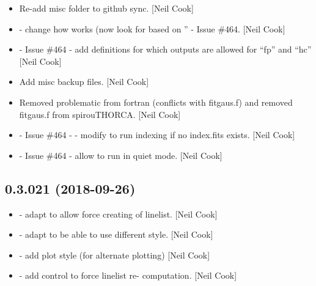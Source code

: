 \documentclass[a4paper,10pt,english]{report}
\begin{document}
\begin{itemize}
\item {} 
Re-add misc folder to github sync. {[}Neil Cook{]}

\item {} 
 - change how  works (now look for
 based on ” - Issue \#464. {[}Neil
Cook{]}

\item {} 
 - Issue \#464 - add definitions for which
outputs are allowed for “fp” and “hc” {[}Neil Cook{]}

\item {} 
Add misc backup files. {[}Neil Cook{]}

\item {} 
Removed problematic  from fortran (conflicts with fitgaus.f)
and removed fitgaus.f from spirouTHORCA. {[}Neil Cook{]}

\item {} 
 - Issue \#464 -  - modify to run
indexing if no index.fits exists. {[}Neil Cook{]}

\item {} 
 - Issue \#464 - allow  to run in
quiet mode. {[}Neil Cook{]}

\end{itemize}


\subsection{0.3.021 (2018-09-26)}
\label{\detokenize{misc/changelog:id310}}\begin{itemize}
\item {} 
 - adapt to allow force creating of linelist. {[}Neil Cook{]}

\item {} 
 - adapt to be able to use different style. {[}Neil Cook{]}

\item {} 
 - add plot style (for alternate plotting) {[}Neil Cook{]}

\item {} 
 - add control to force linelist re-
computation. {[}Neil Cook{]}

\end{itemize}
\end{document}
